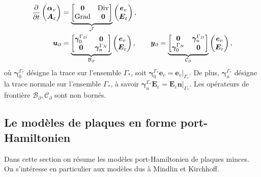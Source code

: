 \begin{equation*}
\begin{aligned}
\displaystyle
\diffp{}{t}
\begin{pmatrix}
\bm{\alpha}_v \\
\bm{A}_\varepsilon
\end{pmatrix} &= \underbrace{
	\begin{bmatrix}
	\bm{0} & \Div \\
	\Grad & \bm{0} \\
	\end{bmatrix}}_{\mathcal{J}}
\begin{pmatrix}
\bm{e}_v \\
\bm{E}_\varepsilon
\end{pmatrix}, \vspace{3pt}\\
\bm{u}_\partial &= \underbrace{
	\begin{bmatrix}
	\bm\gamma_{0}^{\Gamma_D} & \bm{0} \\
	\bm{0} & \bm\gamma_n^{\Gamma_N} \\
	\end{bmatrix}}_{\mathcal{B}_\partial} \begin{pmatrix}
\bm{e}_v \\
\bm{E}_\varepsilon
\end{pmatrix}, \qquad
\bm{y}_\partial = \underbrace{
	\begin{bmatrix}
	\bm{0} & \bm\gamma_{n}^{\Gamma_D} \\
	\bm\gamma_0^{\Gamma_N} & \bm{0} \\
	\end{bmatrix}}_{\mathcal{C}_\partial}
\begin{pmatrix}
\bm{e}_v \\
\bm{E}_\varepsilon
\end{pmatrix},
\end{aligned}
\end{equation*}
où $\bm\gamma_{0}^{\Gamma_*}$ désigne la trace sur l'ensemble $\Gamma_* $, soit $ \bm\gamma_{0}^{\Gamma_*} \bm{e}_v = \bm{e}_v \vert_{\Gamma_*} $. De plus, $ \bm\gamma_{n}^{\Gamma_*} $ désigne la trace normale sur l'ensemble $\Gamma_*$, à savoir $\bm\gamma_{n}^{\Gamma_*} \bm{E}_\varepsilon = \bm{E}_\varepsilon \bm{n} \vert_{\Gamma_*}$. Les opérateurs de frontière $\mathcal{B}_\partial, \mathcal{C}_\partial $ sont non bornés.

\subsection*{Le modèles de plaques en forme port-Hamiltonien}
Dans cette section on résume les modèles port-Hamiltonien de plaques minces. On s'intéresse en particulier aux modèles dus à Mindlin \cite{mindlin1951} et Kirchhoff. 

